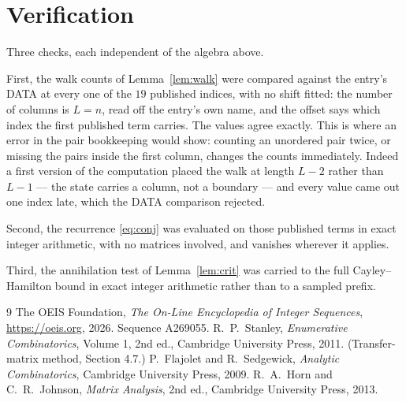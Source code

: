 \documentclass[11pt,a4paper]{article}
\theoremstyle{plain}
\theoremstyle{definition}
\begin{document}
\section{Verification}

Three checks, each independent of the algebra above.

First, the walk counts of Lemma~\ref{lem:walk} were compared against the entry's DATA at
every one of the $19$ published indices, with no shift fitted: the number of columns is
$L=n$, read off the entry's own name, and the offset says which index the first
published term carries. The values agree exactly. This is where an error in the pair
bookkeeping would show: counting an unordered pair twice, or missing the pairs inside the
first column, changes the counts immediately. Indeed a first version of the computation
placed the walk at length $L-2$ rather than $L-1$ --- the state carries a column, not a
boundary --- and every value came out one index late, which the DATA comparison rejected.

Second, the recurrence \eqref{eq:conj} was evaluated on those published terms in exact
integer arithmetic, with no matrices involved, and vanishes wherever it applies.

Third, the annihilation test of Lemma~\ref{lem:crit} was carried to the full
Cayley--Hamilton bound in exact integer arithmetic rather than to a sampled prefix.

\begin{thebibliography}{9}
 The OEIS Foundation, \emph{The On-Line Encyclopedia of Integer
Sequences}, \url{https://oeis.org}, 2026. Sequence A269055.
 R.~P.~Stanley, \emph{Enumerative Combinatorics}, Volume 1, 2nd ed.,
Cambridge University Press, 2011. (Transfer-matrix method, Section 4.7.)
 P.~Flajolet and R.~Sedgewick, \emph{Analytic Combinatorics}, Cambridge
University Press, 2009.
 R.~A.~Horn and C.~R.~Johnson, \emph{Matrix Analysis}, 2nd ed., Cambridge
University Press, 2013.
\end{thebibliography}
\end{document}
